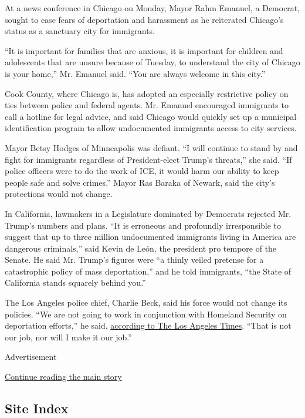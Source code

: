At a news conference in Chicago on Monday, Mayor Rahm Emanuel, a
Democrat, sought to ease fears of deportation and harassment as he
reiterated Chicago's status as a sanctuary city for immigrants.

``It is important for families that are anxious, it is important for
children and adolescents that are unsure because of Tuesday, to
understand the city of Chicago is your home,'' Mr. Emanuel said. ``You
are always welcome in this city.''

Cook County, where Chicago is, has adopted an especially restrictive
policy on ties between police and federal agents. Mr. Emanuel encouraged
immigrants to call a hotline for legal advice, and said Chicago would
quickly set up a municipal identification program to allow undocumented
immigrants access to city services.

Mayor Betsy Hodges of Minneapolis was defiant. ``I will continue to
stand by and fight for immigrants regardless of President-elect Trump's
threats,'' she said. ``If police officers were to do the work of ICE, it
would harm our ability to keep people safe and solve crimes.'' Mayor Ras
Baraka of Newark, said the city's protections would not change.

In California, lawmakers in a Legislature dominated by Democrats
rejected Mr. Trump's numbers and plans. ``It is erroneous and profoundly
irresponsible to suggest that up to three million undocumented
immigrants living in America are dangerous criminals,'' said Kevin de
León, the president pro tempore of the Senate. He said Mr. Trump's
figures were ``a thinly veiled pretense for a catastrophic policy of
mass deportation,'' and he told immigrants, ``the State of California
stands squarely behind you.''

The Los Angeles police chief, Charlie Beck, said his force would not
change its policies. ``We are not going to work in conjunction with
Homeland Security on deportation efforts,'' he said,
\href{http://www.latimes.com/local/lanow/la-me-ln-los-angeles-police-immigration-20161114-story.html}{according
to The Los Angeles Times}. ``That is not our job, nor will I make it our
job.''

Advertisement

\protect\hyperlink{after-bottom}{Continue reading the main story}

\hypertarget{site-index}{%
\subsection{Site Index}\label{site-index}}

